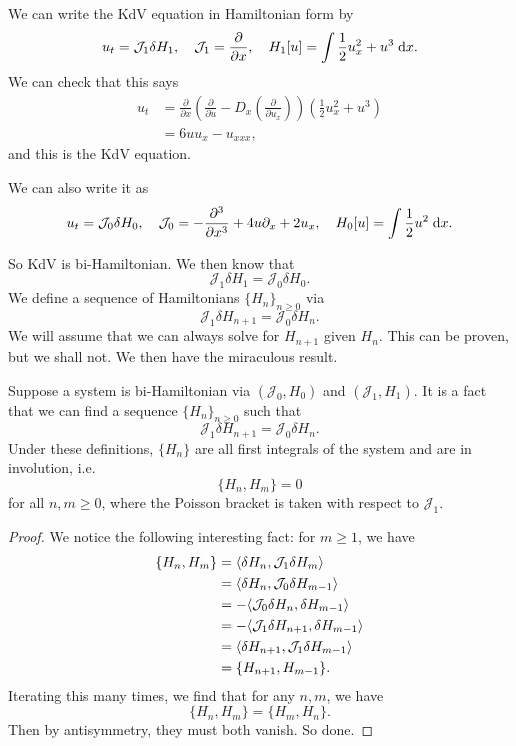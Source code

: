 \documentclass[a4paper]{article}
\begin{document}
\begin{eg}
  We can write the KdV equation in Hamiltonian form by
  \[
    u_t = \mathcal{J}_1 \delta H_1,\quad \mathcal{J}_1 = \frac{\partial}{\partial x},\quad H_1[u] =\int \frac{1}{2}u_x^2 + u^3 \;\mathrm{d} x.
  \]
  We can check that this says
  \begin{align*}
    u_t &= \frac{\partial}{\partial x}\left(\frac{\partial}{\partial u} - D_x \left(\frac{\partial}{\partial u_x}\right)\right)\left(\frac{1}{2}u_x^2 + u^3\right)\\
    &= 6uu_x- u_{xxx},
  \end{align*}
  and this is the KdV equation.

  We can also write it as
  \[
    u_t = \mathcal{J}_0 \delta H_0,\quad \mathcal{J}_0 = - \frac{\partial^3}{\partial x^3} + 4u \partial_x + 2 u_x,\quad H_0[u] = \int \frac{1}{2}u^2 \;\mathrm{d} x.
  \]
\end{eg}
So KdV is bi-Hamiltonian. We then know that
\[
  \mathcal{J}_1 \delta H_1 = \mathcal{J}_0 \delta H_0.
\]
We define a sequence of Hamiltonians $\{H_n\}_{n \geq 0}$ via
\[
  \mathcal{J}_1 \delta H_{n + 1} = \mathcal{J}_0 \delta H_n.
\]
We will assume that we can always solve for $H_{n + 1}$ given $H_n$. This can be proven, but we shall not. We then have the miraculous result.

\begin{thm}
  Suppose a system is bi-Hamiltonian via $(\mathcal{J}_0, H_0)$ and $(\mathcal{J}_1, H_1)$. It is a fact that we can find a sequence $\{H_n\}_{n \geq 0}$ such that
  \[
    \mathcal{J}_1 \delta H_{n + 1} = \mathcal{J}_0 \delta H_n.
  \]
  Under these definitions, $\{H_n\}$ are all first integrals of the system and are in involution, i.e.
  \[
    \{H_n, H_m\} = 0
  \]
  for all $n, m \geq 0$, where the Poisson bracket is taken with respect to $\mathcal{J}_1$.
\end{thm}

\begin{proof}
  We notice the following interesting fact: for $m \geq 1$, we have
  \begin{align*}
    \{H_n, H_m\} &= \langle \delta H_n, \mathcal{J}_1 \delta H_m\rangle\\
    &= \langle \delta H_n, \mathcal{J}_0 \delta H_{m - 1}\rangle\\
    &= - \langle \mathcal{J}_0 \delta H_n, \delta H_{m - 1}\rangle\\
    &= - \langle \mathcal{J}_1 \delta H_{n + 1}, \delta H_{m - 1}\rangle\\
    &= \langle \delta H_{n + 1}, \mathcal{J}_1 \delta H_{m - 1}\rangle\\
    &= \{H_{n + 1}, H_{m - 1}\}.
  \end{align*}
  Iterating this many times, we find that for any $n, m$, we have
  \[
    \{H_n, H_m\} = \{H_m, H_n\}.
  \]
  Then by antisymmetry, they must both vanish. So done.
\end{proof}
\end{document}
